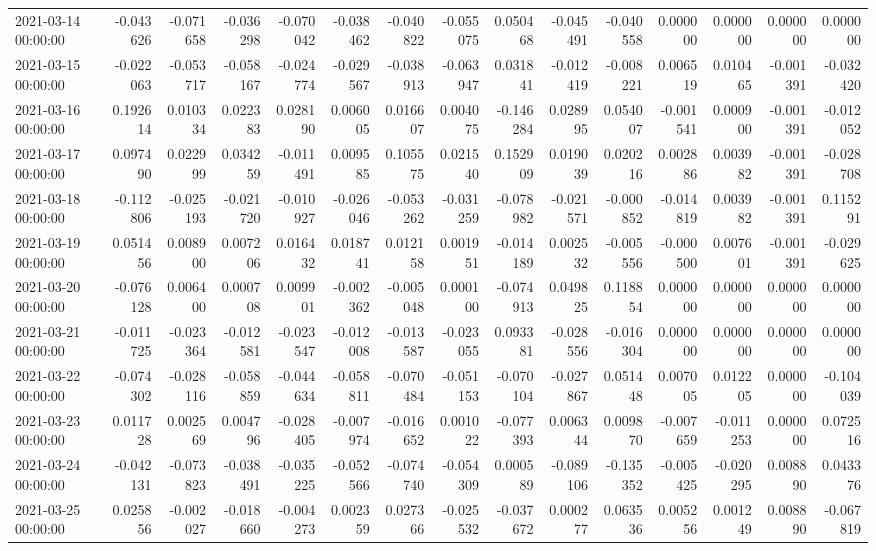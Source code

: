 \begin{tabular}{lrrrrrrrrrrrrrr}
2021-03-14 00:00:00 & -0.043626 & -0.071658 & -0.036298 & -0.070042 & -0.038462 & -0.040822 & -0.055075 & 0.050468 & -0.045491 & -0.040558 & 0.000000 & 0.000000 & 0.000000 & 0.000000 \\
2021-03-15 00:00:00 & -0.022063 & -0.053717 & -0.058167 & -0.024774 & -0.029567 & -0.038913 & -0.063947 & 0.031841 & -0.012419 & -0.008221 & 0.006519 & 0.010465 & -0.001391 & -0.032420 \\
2021-03-16 00:00:00 & 0.192614 & 0.010334 & 0.022383 & 0.028190 & 0.006005 & 0.016607 & 0.004075 & -0.146284 & 0.028995 & 0.054007 & -0.001541 & 0.000900 & -0.001391 & -0.012052 \\
2021-03-17 00:00:00 & 0.097490 & 0.022999 & 0.034259 & -0.011491 & 0.009585 & 0.105575 & 0.021540 & 0.152909 & 0.019039 & 0.020216 & 0.002886 & 0.003982 & -0.001391 & -0.028708 \\
2021-03-18 00:00:00 & -0.112806 & -0.025193 & -0.021720 & -0.010927 & -0.026046 & -0.053262 & -0.031259 & -0.078982 & -0.021571 & -0.000852 & -0.014819 & 0.003982 & -0.001391 & 0.115291 \\
2021-03-19 00:00:00 & 0.051456 & 0.008900 & 0.007206 & 0.016432 & 0.018741 & 0.012158 & 0.001951 & -0.014189 & 0.002532 & -0.005556 & -0.000500 & 0.007601 & -0.001391 & -0.029625 \\
2021-03-20 00:00:00 & -0.076128 & 0.006400 & 0.000708 & 0.009901 & -0.002362 & -0.005048 & 0.000100 & -0.074913 & 0.049825 & 0.118854 & 0.000000 & 0.000000 & 0.000000 & 0.000000 \\
2021-03-21 00:00:00 & -0.011725 & -0.023364 & -0.012581 & -0.023547 & -0.012008 & -0.013587 & -0.023055 & 0.093381 & -0.028556 & -0.016304 & 0.000000 & 0.000000 & 0.000000 & 0.000000 \\
2021-03-22 00:00:00 & -0.074302 & -0.028116 & -0.058859 & -0.044634 & -0.058811 & -0.070484 & -0.051153 & -0.070104 & -0.027867 & 0.051448 & 0.007005 & 0.012205 & 0.000000 & -0.104039 \\
2021-03-23 00:00:00 & 0.011728 & 0.002569 & 0.004796 & -0.028405 & -0.007974 & -0.016652 & 0.001022 & -0.077393 & 0.006344 & 0.009870 & -0.007659 & -0.011253 & 0.000000 & 0.072516 \\
2021-03-24 00:00:00 & -0.042131 & -0.073823 & -0.038491 & -0.035225 & -0.052566 & -0.074740 & -0.054309 & 0.000589 & -0.089106 & -0.135352 & -0.005425 & -0.020295 & 0.008890 & 0.043376 \\
2021-03-25 00:00:00 & 0.025856 & -0.002027 & -0.018660 & -0.004273 & 0.002359 & 0.027366 & -0.025532 & -0.037672 & 0.000277 & 0.063536 & 0.005256 & 0.001249 & 0.008890 & -0.067819 \\

\end{tabular}
